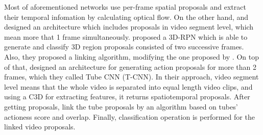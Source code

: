 Most of aforementioned networks use per-frame spatial proposals and extract their temporal infomation by calculating optical flow. On the other hand,  \cite{DBLP:journals/corr/SahaSC17} and  \cite{DBLP:journals/corr/HouCS17} designed an architecture which includes proposals in video segment level, which mean  more that 1 frame simultaneously. \cite{DBLP:journals/corr/SahaSC17} proposed a 3D-RPN which
is able to generate and classify 3D region proposals consisted of two successive frames. Also, they proposed a linking algorithm, modifying the one proposed by \cite{DBLP:journals/corr/SahaSSTC16}.
On top of that, \cite{DBLP:journals/corr/HouCS17} designed an architecture for generating action proposals for more than 2 frames, which they called Tube CNN (T-CNN). In their approach, video segment level means that the whole video is separated into equal length video clips, and
using a C3D for extracting features, it returns spatiotemporal proposals. After getting proposals, \cite{DBLP:journals/corr/HouCS17} link the tube proposals by an algorithm based on tubes'
actioness score and overlap. Finally, classification operation is performed for the linked video proposals.


% 